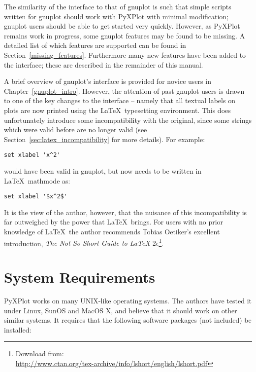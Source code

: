 The similarity of the interface to that of gnuplot is such that simple scripts
written for gnuplot should work with PyXPlot with minimal modification; gnuplot
users should be able to get started very quickly.  However, as PyXPlot remains
work in progress, some gnuplot features may be found to be missing.  A detailed
list of which features are supported can be found in
Section~\ref{missing_features}.  Furthermore many new features have been added
to the interface; these are described in the remainder of this manual.

A brief overview of gnuplot's interface is provided for novice users in
Chapter~\ref{gnuplot_intro}. However, the attention of past gnuplot users is
drawn to one of the key changes to the interface -- namely that all textual
labels on plots are now printed using the \LaTeX\ typesetting environment. This
does unfortunately introduce some incompatibility with the original, since some
strings which were valid before are no longer valid (see
Section~\ref{sec:latex_incompatibility} for more details). For example:

\begin{verbatim}set xlabel 'x^2'\end{verbatim}

\noindent would have been valid in gnuplot, but now needs to be written in
\LaTeX\ mathmode as:

\begin{verbatim}set xlabel '$x^2$'\end{verbatim}

\noindent It is the view of the author, however, that the nuisance of this
incompatibility is far outweighed by the power that \LaTeX\ brings. For users
with no prior knowledge of \LaTeX\ the author recommends Tobias Oetiker's
excellent introduction, \textit{The Not So Short Guide to \LaTeX
$2\epsilon$}\footnote{Download from:\\
\url{http://www.ctan.org/tex-archive/info/lshort/english/lshort.pdf}}.

\section{System Requirements}

PyXPlot works on many UNIX-like operating systems. The authors have tested it
under Linux, SunOS and MacOS X, and believe that it should work on other
similar systems. It requires that the following software packages (not
included) be installed:

